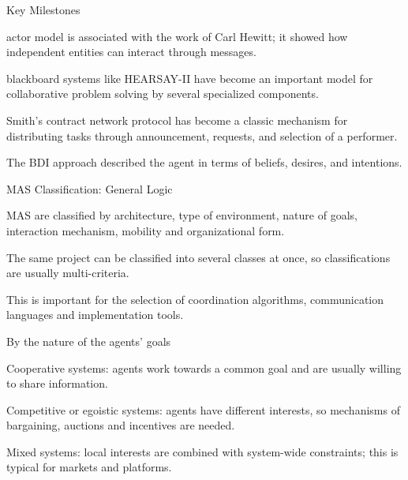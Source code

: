 \begin{frame}{Key Milestones}
	\topline
	\justifying
	\begin{textitemize}
		\item actor model is associated with the work of Carl Hewitt; it showed how independent entities can interact through messages.
		\item blackboard systems like HEARSAY-II have become an important model for collaborative problem solving by several specialized components.
		\item Smith's contract network protocol has become a classic mechanism for distributing tasks through announcement, requests, and selection of a performer.
		\item The BDI approach described the agent in terms of beliefs, desires, and intentions.
	\end{textitemize}
\end{frame}

\begin{frame}{MAS Classification: General Logic}
	\topline
	\justifying
	\begin{textitemize}
		\item MAS are classified by architecture, type of environment, nature of goals, interaction mechanism, mobility and organizational form.
		\item The same project can be classified into several classes at once, so classifications are usually multi-criteria.
		\item This is important for the selection of coordination algorithms, communication languages and implementation tools.
	\end{textitemize}
\end{frame}

\begin{frame}{By the nature of the agents' goals}
	\topline
	\justifying
	\begin{textitemize}
		\item Cooperative systems: agents work towards a common goal and are usually willing to share information.
		\item Competitive or egoistic systems: agents have different interests, so mechanisms of bargaining, auctions and incentives are needed.
		\item Mixed systems: local interests are combined with system-wide constraints; this is typical for markets and platforms.
	\end{textitemize}
\end{frame}

